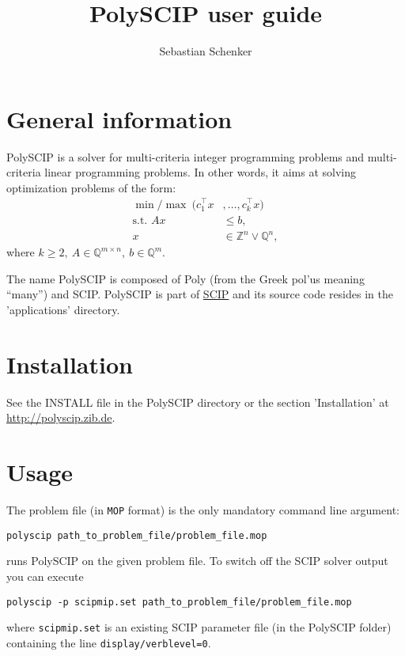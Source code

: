 \documentclass[11pt,listof=totoc]{scrartcl}
\title{PolySCIP user guide}
\author{Sebastian Schenker}
\date{}
\theoremstyle{definition}
\begin{document}
\maketitle
\tableofcontents

\section{General information}
PolySCIP is a solver for multi-criteria integer programming problems
and multi-criteria linear programming problems. In other words, it
aims at solving optimization problems of the form:
\begin{align*}
\min / \max~ (c_1^\top x&, \ldots, c_k^\top x) \\
\mbox{s.t. } Ax &\leq b,\\
x &\in \mathbb{Z}^n \lor \mathbb{Q}^n,
\end{align*}
where $k \geq 2,~ A \in \mathbb{Q}^{m \times n},~ b \in
\mathbb{Q}^m$.

The name PolySCIP is composed of Poly (from the Greek
\textgreek{pol'us} meaning ``many'') and SCIP. PolySCIP is part of \href{http://scipopt.org}{SCIP} and its source code resides in the 'applications' directory.

\section{Installation}

See the INSTALL file in the PolySCIP directory or the section 'Installation' at \url{http://polyscip.zib.de}.

\section{Usage}

The problem file (in \texttt{MOP} format) is the only mandatory command line argument:
\begin{verbatim}
polyscip path_to_problem_file/problem_file.mop
\end{verbatim} runs PolySCIP on the given problem file. To switch off the SCIP solver output you can execute
\begin{verbatim}
polyscip -p scipmip.set path_to_problem_file/problem_file.mop
\end{verbatim} where \texttt{scipmip.set} is an existing SCIP parameter file (in the PolySCIP folder) containing the line \texttt{display/verblevel=0}.
\end{document}

